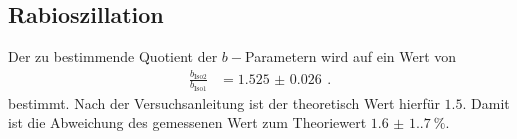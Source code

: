 \subsection{Rabioszillation}
Der zu bestimmende Quotient der $b-$Parametern wird auf ein Wert von
\begin{align*}
    \frac{b_\text{Iso2}}{b_\text{Iso1}} &= \SI{1.525(26)}{} \, .
\end{align*}
bestimmt.
Nach der Versuchsanleitung ist der theoretisch Wert hierfür $1.5$. 
Damit ist die Abweichung des gemessenen Wert zum Theoriewert $\SI{1.6(1.7)}{}\%$.